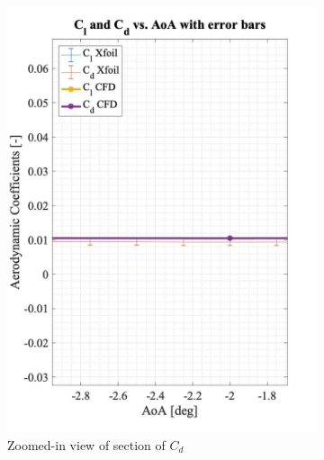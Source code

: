 \begin{figure}[H]
  \begin{subfigure}[b]{0.5\textwidth}
    \includegraphics[width=\textwidth]{error_bar2.jpg}
    \caption{Zoomed-in view of section of $C_d$}
    \label{fig:error_bar2}
  \end{subfigure}
  \begin{subfigure}[b]{0.5\textwidth}

\end{subfigure}
\end{figure}
